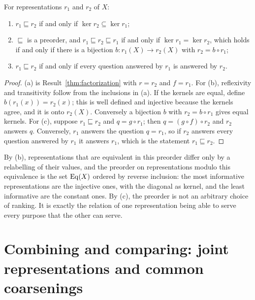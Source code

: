 \begin{established}\label{prop:adequacy-kernel}
For representations $r_1$ and $r_2$ of $X$:
\begin{enumerate}[nosep,label=(\alph*)]
  \item $r_1\sqsubseteq r_2$ if and only if $\ker r_2\subseteq\ker r_1$;
  \item $\sqsubseteq$ is a preorder, and $r_1\sqsubseteq r_2\sqsubseteq r_1$ if and only if $\ker r_1=\ker r_2$, which holds if and only if there is a bijection $b:r_1(X)\to r_2(X)$ with $r_2=b\circ r_1$;
  \item $r_1\sqsubseteq r_2$ if and only if every question answered by $r_1$ is answered by $r_2$.
\end{enumerate}
\end{established}
\begin{proof}
(a) is Result~\ref{thm:factorization} with $r=r_2$ and $f=r_1$. For (b), reflexivity and transitivity follow from the inclusions in (a). If the kernels are equal, define $b(r_1(x))=r_2(x)$; this is well defined and injective because the kernels agree, and it is onto $r_2(X)$. Conversely a bijection $b$ with $r_2=b\circ r_1$ gives equal kernels. For (c), suppose $r_1\sqsubseteq r_2$ and $q=g\circ r_1$; then $q=(g\circ f)\circ r_2$ and $r_2$ answers $q$. Conversely, $r_1$ answers the question $q=r_1$, so if $r_2$ answers every question answered by $r_1$ it answers $r_1$, which is the statement $r_1\sqsubseteq r_2$.
\end{proof}

By (b), representations that are equivalent in this preorder differ only by a relabelling of their values, and the preorder on representations modulo this equivalence is the set $\operatorname{Eq}(X)$ ordered by reverse inclusion: the most informative representations are the injective ones, with the diagonal as kernel, and the least informative are the constant ones. By (c), the preorder is not an arbitrary choice of ranking. It is exactly the relation of one representation being able to serve every purpose that the other can serve.

\section{Combining and comparing: joint representations and common coarsenings}


